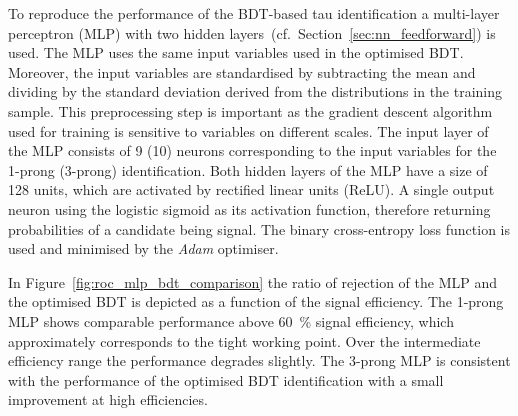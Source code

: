 To reproduce the performance of the BDT-based tau identification a multi-layer
perceptron (MLP) with two hidden layers~(cf.\ Section~\ref{sec:nn_feedforward})
is used. The MLP uses the same input variables used in the optimised BDT.
Moreover, the input variables are standardised by subtracting the mean and
dividing by the standard deviation derived from the distributions in the
training sample. This preprocessing step is important as the gradient descent
algorithm used for training is sensitive to variables on different scales. The
input layer of the MLP consists of 9 (10) neurons corresponding to the input
variables for the 1-prong (3-prong) identification. Both hidden layers of the
MLP have a size of 128 units, which are activated by rectified linear units
(ReLU). A single output neuron using the logistic sigmoid as its activation
function, therefore returning probabilities of a \tauhadvis candidate being
signal. The binary cross-entropy loss function is used and minimised by the
\emph{Adam} optimiser.

In Figure~\ref{fig:roc_mlp_bdt_comparison} the ratio of rejection of the MLP and
the optimised BDT is depicted as a function of the signal efficiency. The
1-prong MLP shows comparable performance above \SI{60}{\percent} signal
efficiency, which approximately corresponds to the tight working point. Over the
intermediate efficiency range the performance degrades slightly. The 3-prong MLP
is consistent with the performance of the optimised BDT identification with a
small improvement at high efficiencies.

